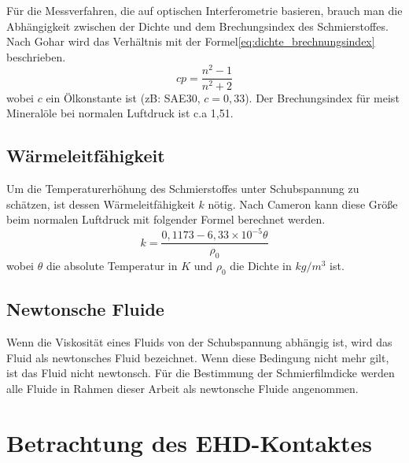 Für die Messverfahren, die auf optischen Interferometrie basieren, brauch man die Abhängigkeit zwischen der Dichte und dem Brechungsindex des Schmierstoffes.
Nach Gohar wird das Verhältnis mit der Formel\ref{eq:dichte_brechnungsindex} beschrieben.
\begin{equation}
    \label{eq:dichte_brechnungsindex}
    c  p = \frac{n^2 - 1}{n^2 + 2}
\end{equation}
%
wobei $c$ ein Ölkonstante ist (zB: SAE30, $c = 0,33$).
Der Brechungsindex für meist Mineralöle bei normalen Luftdruck ist c.a 1,51.


\subsection*{Wärmeleitfähigkeit}
\label{waermeleitfaehigkeit}

Um die Temperaturerhöhung des Schmierstoffes unter Schubspannung zu schätzen, ist dessen Wärmeleitfähigkeit $k$ nötig.
Nach Cameron\cite{cameron} kann diese Größe beim normalen Luftdruck mit folgender Formel berechnet werden.
\begin{equation}
    \label{eq:waermeleitfaehigkeit}
    k = \frac{0,1173 - 6,33 \times 10^{-5}  \theta}{\rho_0}
\end{equation}
%
wobei $\theta$ die absolute Temperatur in $K$ und $\rho_0$ die Dichte in $kg/m^3$ ist.

\subsection*{Newtonsche Fluide}
\label{sub:newtonsche_fluide}

Wenn die Viskosität eines Fluids von der Schubspannung abhängig ist, wird das Fluid als newtonsches Fluid bezeichnet.
Wenn diese Bedingung nicht mehr gilt, ist das Fluid nicht newtonsch.
Für die Bestimmung der Schmierfilmdicke werden alle Fluide in Rahmen dieser Arbeit als newtonsche Fluide angenommen.

\section{Betrachtung des EHD-Kontaktes}
\label{sec:betrachtung_des_ehd_kontaktes}

